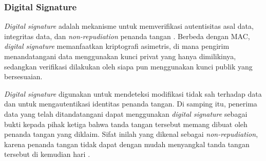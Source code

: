 \subsubsection{Digital Signature}
\textit{Digital signature} adalah mekanisme untuk memverifikasi autentisitas asal data, integritas data, dan \textit{non-repudiation} penanda tangan \parencite{NIST_glossary_digitalsig}.
Berbeda dengan MAC, \textit{digital signature} memanfaatkan kriptografi asimetris, di mana pengirim menandatangani data menggunakan kunci privat yang hanya dimilikinya, sedangkan verifikasi dilakukan oleh siapa pun menggunakan kunci publik yang bersesuaian.

\textit{Digital signature} digunakan untuk mendeteksi modifikasi tidak sah terhadap data dan untuk mengautentikasi identitas penanda tangan. %
Di samping itu, penerima data yang telah ditandatangani dapat menggunakan \textit{digital signature} sebagai bukti kepada pihak ketiga bahwa tanda tangan tersebut memang dibuat oleh penanda tangan yang diklaim.
Sifat inilah yang dikenal sebagai \textit{non-repudiation}, karena penanda tangan tidak dapat dengan mudah menyangkal tanda tangan tersebut di kemudian hari \parencite{NIST_FIPS186-5}.



